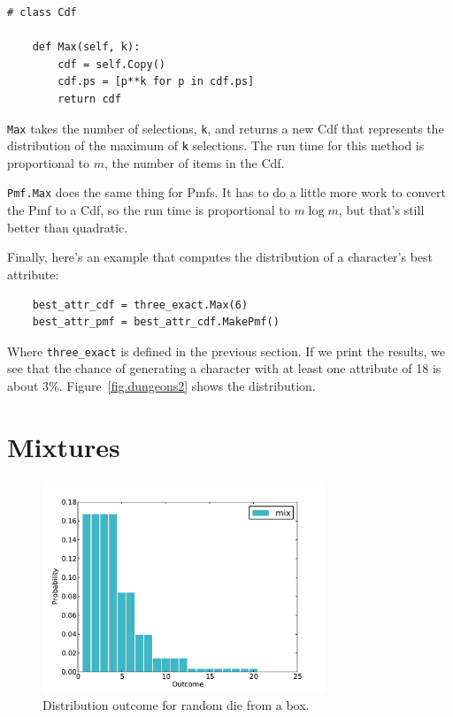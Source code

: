 \documentclass[12pt]{book}
\begin{document}
\begin{verbatim}
# class Cdf

    def Max(self, k):
        cdf = self.Copy()
        cdf.ps = [p**k for p in cdf.ps]
        return cdf
\end{verbatim}

\verb"Max" takes the number of selections, {\tt k}, and returns a new
Cdf that represents the distribution of the maximum of {\tt k}
selections.  The run time for this method is proportional to 
$m$, the number of items in the Cdf.

\verb"Pmf.Max" does the same thing for Pmfs.  It has to do a little
more work to convert the Pmf to a Cdf, so the run time is proportional
to $m \log m$, but that's still better than quadratic.

Finally, here's an example that computes the distribution of
a character's best attribute:

\begin{verbatim}
    best_attr_cdf = three_exact.Max(6)
    best_attr_pmf = best_attr_cdf.MakePmf()
\end{verbatim}

Where \verb"three_exact" is defined in the previous section.
If we print the results, we see that the chance of generating
a character with at least one attribute of 18 is about 3\%.
Figure~\ref{fig.dungeons2} shows the distribution.


\section{Mixtures}
\label{mixture}

\begin{figure}
\centerline{\includegraphics[height=2.5in]{figs/dungeons3.pdf}}
\caption{Distribution outcome for random die from a box.}
\label{fig.dungeons3}
\end{figure}
\end{document}
